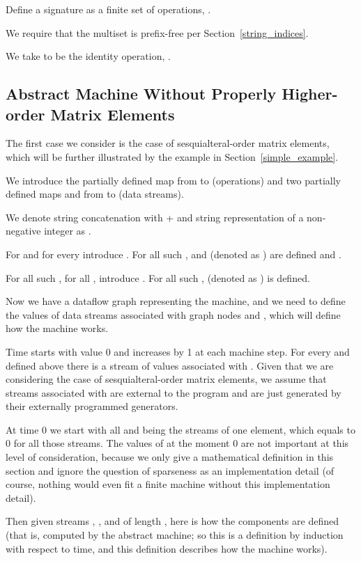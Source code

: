 \documentclass[withtimes]{easychair}
\begin{document}
Define a signature as a finite set of operations, . 

We require that the multiset  is
prefix-free per Section~\ref{string_indices}.

We take  to be the identity operation, .

\subsection{Abstract Machine Without Properly Higher-order Matrix Elements}\label{abstract_basic}

The first case we consider is the case of sesquialteral-order matrix elements, which will be further
illustrated by the example in Section~\ref{simple_example}.

We introduce the partially defined map  from  to  (operations) and two partially
defined maps  and  from  to  (data streams).

We denote string concatenation with + and string representation of a non-negative integer  as .

For  and for every  introduce 
. 
For all such ,  and  (denoted as ) are defined and .

For all such , for all , introduce . 
For all such ,  (denoted as ) is defined. 

Now we have a dataflow graph representing the machine, and we need to define
the values of data streams  associated with
graph nodes  and , which will define how the machine works.

Time starts with value 0 and increases by 1 at each machine step. For every  and 
defined above there is a stream of values 
associated with . Given that we are considering the case of
sesquialteral-order matrix elements, we assume that streams associated with
 are external to the program and are just generated by their
externally programmed generators.

At time 0 we start with all  and  being the streams of one element,
which equals to 0 for all those streams. The values of  at the moment 0
are not important at this level of consideration, because we only give a mathematical
definition in this section and ignore the question of sparseness as an
implementation detail (of course, nothing would even fit a finite machine
without this implementation detail).

Then given streams , , and  of length , here is how
the components  are defined (that is, computed by the abstract machine; so this is a definition by
induction with respect to time, and this definition describes how the machine works).
\end{document}
